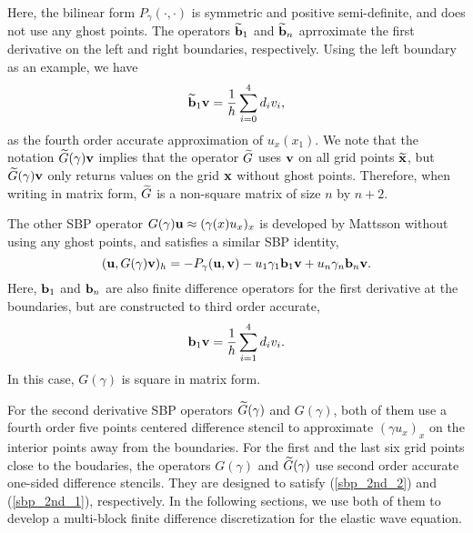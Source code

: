 Here, the bilinear form $P_\gamma(\cdot,\cdot)$ is symmetric and positive semi-definite, and does not use any ghost points. The operators $\widetilde{\bf b}_1$ and $\widetilde{\bf b}_n$ aprroximate the first derivative on the left and right boundaries, respectively. Using the left boundary as an example, we have 
\begin{equation}\label{sbp_1st_1}
\wt{\bf b}_1 {\bf v} = \frac{1}{h}\sum_{i=0}^{4} d_i v_i,
\end{equation}
as the fourth order accurate approximation of $u_x(x_1)$. We note that the notation $\widetilde{G}(\gamma){\bf v}$ implies that the operator $\widetilde{G}$ uses ${\bf v}$ on all grid points $\widetilde{\bf x}$, but $\widetilde{G}(\gamma){\bf v}$ only returns values on the grid ${\bf x}$ without ghost points. Therefore, when writing in matrix form, $\widetilde{G}$ is a non-square matrix of size $n$ by $n+2$.

The other SBP operator ${G}(\gamma){\bf u} \approx (\gamma(x)u_x)_x $ is developed by Mattsson \cite{mattsson2004summation} without using any ghost points, and satisfies a similar SBP identity,
\begin{equation}\label{sbp_2nd_2}
({\bf u}, G(\gamma){\bf v})_h = -P_\gamma({\bf u},{\bf v})-u_1\gamma_1{\bf b}_1{\bf v} + u_n\gamma_n{\bf b}_n{\bf v}.
\end{equation}
Here, ${\bf b}_1$ and ${\bf b}_n$ are also finite difference operators for the first derivative at the boundaries, but are constructed to third order accurate,
\begin{equation}\label{sbp_1st_2}
{\bf b}_1 {\bf v} = \frac{1}{h}\sum_{i=1}^{4} d_i v_i. 
\end{equation}
In this case, ${G}(\gamma)$ is square in matrix form. 

For the second derivative SBP operators $\widetilde{G}(\gamma)$ and $G(\gamma)$, both of them use a fourth order five points centered difference stencil to approximate $(\gamma u_x)_x$ on the interior points away from the boundaries. For the first and the last six grid points close to the boudaries, the operators $G(\gamma)$ and $\widetilde{G}(\gamma)$ use second order accurate one-sided difference stencils. They are designed to satisfy (\ref{sbp_2nd_2}) and (\ref{sbp_2nd_1}), respectively. In the following sections, we use both of them to develop a multi-block finite difference discretization for the elastic wave equation. 
